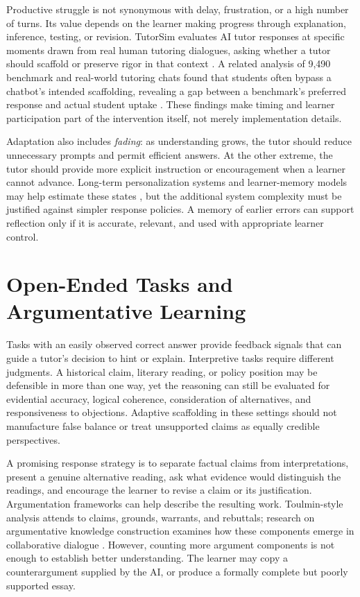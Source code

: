 \documentclass[11pt,a4paper]{article}
\begin{document}
Productive struggle is not synonymous with delay, frustration, or a high number of turns. Its value depends on the learner making progress through explanation, inference, testing, or revision. TutorSim evaluates AI tutor responses at specific moments drawn from real human tutoring dialogues, asking whether a tutor should scaffold or preserve rigor in that context \cite{P52}. A related analysis of 9,490 benchmark and real-world tutoring chats found that students often bypass a chatbot's intended scaffolding, revealing a gap between a benchmark's preferred response and actual student uptake \cite{P39}. These findings make timing and learner participation part of the intervention itself, not merely implementation details.

Adaptation also includes \emph{fading}: as understanding grows, the tutor should reduce unnecessary prompts and permit efficient answers. At the other extreme, the tutor should provide more explicit instruction or encouragement when a learner cannot advance. Long-term personalization systems and learner-memory models may help estimate these states \cite{P03,P23,P33}, but the additional system complexity must be justified against simpler response policies. A memory of earlier errors can support reflection only if it is accurate, relevant, and used with appropriate learner control.

\section{Open-Ended Tasks and Argumentative Learning}
Tasks with an easily observed correct answer provide feedback signals that can guide a tutor's decision to hint or explain. Interpretive tasks require different judgments. A historical claim, literary reading, or policy position may be defensible in more than one way, yet the reasoning can still be evaluated for evidential accuracy, logical coherence, consideration of alternatives, and responsiveness to objections. Adaptive scaffolding in these settings should not manufacture false balance or treat unsupported claims as equally credible perspectives.

A promising response strategy is to separate factual claims from interpretations, present a genuine alternative reading, ask what evidence would distinguish the readings, and encourage the learner to revise a claim or its justification. Argumentation frameworks can help describe the resulting work. Toulmin-style analysis attends to claims, grounds, warrants, and rebuttals; research on argumentative knowledge construction examines how these components emerge in collaborative dialogue \cite{P08}. However, counting more argument components is not enough to establish better understanding. The learner may copy a counterargument supplied by the AI, or produce a formally complete but poorly supported essay.
\end{document}
